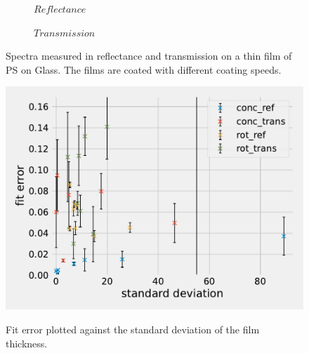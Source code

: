 \begin{figure}[ht]
    \centering
    \begin{subfigure}[b]{0.70\textwidth}
        \centering
        
        \caption{$Reflectance$}
        \label{fig:y equals x}
    \end{subfigure}  
    

    \begin{subfigure}[b]{0.70\textwidth}
        \centering
           
        \caption{$Transmission$} 
        \label{fig:three sin x}
    \end{subfigure}

    \caption{Spectra measured in reflectance and transmission on a thin film of PS on Glass. The films are coated with different coating speeds.}
    \label{fig:SpecRefTrans}
\end{figure}

\begin{figure}
    \centering
    \includegraphics[]{Programmien/FitFehlergegenstd/FitFehlergegenStd.pdf}
    \label{fig:FitFehlergegenStd}
    \caption{Fit error plotted against the standard deviation of the film thickness.}
\end{figure}



